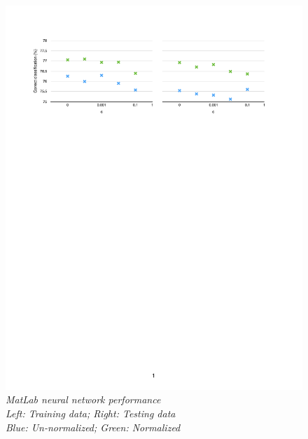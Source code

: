 \documentclass          {article} %
\begin{document}
\begin                  {figure}
\begin                  {center}
\includegraphics        [scale = 0.6]
                        {fig2.pdf}
\caption                {\small\textit{MatLab neural network performance\\Left: Training data; Right: Testing data\\Blue: Un-normalized; Green: Normalized}}
\label                  {fig:fig2}
\end                    {center}
\end                    {figure}
\end{document}

